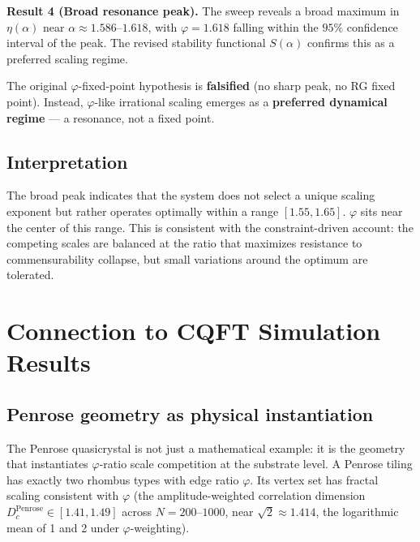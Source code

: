 \documentclass[11pt,a4paper]{article}
\theoremstyle{plain}
\theoremstyle{definition}
\newcommand{\phiGolden}{\varphi}
\begin{document}
\begin{keybox}
\textbf{Result 4 (Broad resonance peak).}
The sweep reveals a broad maximum in $\eta(\alpha)$ near
$\alpha \approx 1.586$--$1.618$, with $\phiGolden = 1.618$ falling
within the $95\%$ confidence interval of the peak. The revised stability
functional $S(\alpha)$ confirms this as a preferred scaling regime.

The original $\phiGolden$-fixed-point hypothesis is \textbf{falsified}
(no sharp peak, no RG fixed point). Instead, $\phiGolden$-like irrational
scaling emerges as a \textbf{preferred dynamical regime} --- a resonance,
not a fixed point.
\end{keybox}

\subsection{Interpretation}

The broad peak indicates that the system does not select a unique
scaling exponent but rather operates optimally within a range
$[1.55, 1.65]$. $\phiGolden$ sits near the center of this range.
This is consistent with the constraint-driven account: the competing
scales are balanced at the ratio that maximizes resistance to
commensurability collapse, but small variations around the optimum
are tolerated.

\section{Connection to CQFT Simulation Results}
\label{sec:penrose}

\subsection{Penrose geometry as physical instantiation}

The Penrose quasicrystal is not just a mathematical example: it is the
geometry that instantiates $\phiGolden$-ratio scale competition at the
substrate level. A Penrose tiling has exactly two rhombus types with
edge ratio $\phiGolden$. Its vertex set has fractal scaling consistent
with $\phiGolden$ (the amplitude-weighted correlation dimension
$D_c^{\text{Penrose}} \in [1.41, 1.49]$ across $N = 200$--$1000$,
near $\sqrt{2} \approx 1.414$, the logarithmic mean of 1 and 2 under
$\phiGolden$-weighting).
\end{document}
